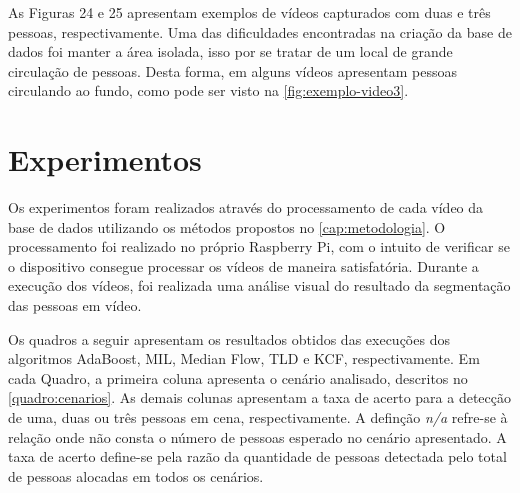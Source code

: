 \documentclass[12pt,oneside,a4paper,chapter=TITLE,section=TITLE,sumario=tradicional]{abntex2}
\begin{document}
As Figuras 24 e 25 apresentam exemplos de vídeos capturados com duas e três pessoas, respectivamente. Uma das dificuldades encontradas na criação da base de dados foi manter a área isolada, isso por se tratar de um local de grande circulação de pessoas. Desta forma, em alguns vídeos apresentam pessoas circulando ao fundo, como pode ser visto na \autoref{fig:exemplo-video3}.

\begin{figure}[htb]
    \hfil
    \hfil

    \hfil
    \hfil
    
    \fonteautor
\end{figure}

\begin{figure}[htb]
    \hfil
    \hfil

    \hfil
    \hfil
    
    \fonteautor
\end{figure}


\section{Experimentos}

Os experimentos foram realizados através do processamento de cada vídeo da base de dados utilizando os métodos propostos no \autoref{cap:metodologia}. O processamento foi realizado no próprio Raspberry Pi, com o intuito de verificar se o dispositivo consegue processar os vídeos de maneira satisfatória. Durante a execução dos vídeos, foi realizada uma análise visual do resultado da segmentação das pessoas em vídeo. 


Os quadros a seguir apresentam os resultados obtidos das execuções dos algoritmos AdaBoost, MIL, Median Flow, TLD e KCF, respectivamente. Em cada Quadro, a primeira coluna apresenta o cenário analisado, descritos no \autoref{quadro:cenarios}. As demais colunas apresentam a taxa de acerto para a detecção  de uma, duas ou três pessoas em cena, respectivamente. 
A definção \textit{n/a} refre-se à relação onde não consta o número de pessoas esperado no cenário apresentado. A taxa de acerto define-se pela razão da quantidade de pessoas detectada pelo total de pessoas alocadas em todos os cenários.
\end{document}
